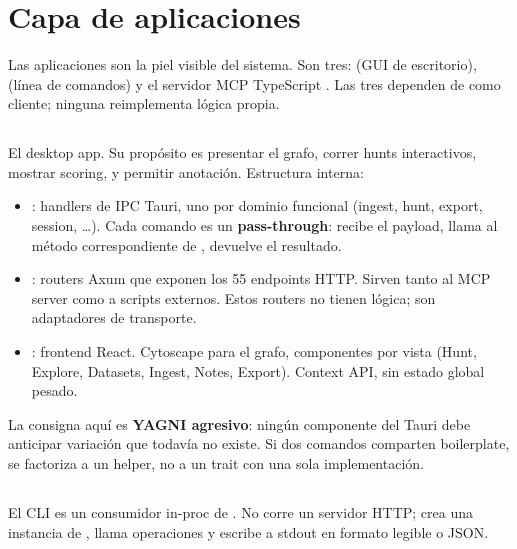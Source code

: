 \chapter{Capa de aplicaciones}
\label{sec:capa-apps}

Las aplicaciones son la piel visible del sistema. Son tres:
 (GUI de escritorio), 
(línea de comandos) y el servidor MCP TypeScript
. Las tres dependen de
 como cliente; ninguna reimplementa lógica
propia.

\section{}

El desktop app. Su propósito es presentar el grafo, correr hunts
interactivos, mostrar scoring, y permitir anotación. Estructura
interna:

\begin{itemize}
    \item {}: handlers de IPC
    Tauri, uno por dominio funcional (ingest, hunt, export,
    session, \ldots). Cada comando es un \textbf{pass-through}: recibe
    el payload, llama al método correspondiente de
    , devuelve el resultado.
    \item {}: routers Axum que
    exponen los 55 endpoints HTTP. Sirven tanto al MCP server como
    a scripts externos. Estos routers no tienen lógica; son
    adaptadores de transporte.
    \item {}: frontend React. Cytoscape para el grafo,
    componentes por vista (Hunt, Explore, Datasets, Ingest, Notes,
    Export). Context API, sin estado global pesado.
\end{itemize}

La consigna aquí es \textbf{YAGNI agresivo}: ningún componente del
Tauri debe anticipar variación que todavía no existe. Si dos
comandos comparten boilerplate, se factoriza a un helper, no a un
trait con una sola implementación.

\section{}

El CLI es un consumidor in-proc de . No
corre un servidor HTTP; crea una instancia de
, llama operaciones y escribe a stdout en
formato legible o JSON.

